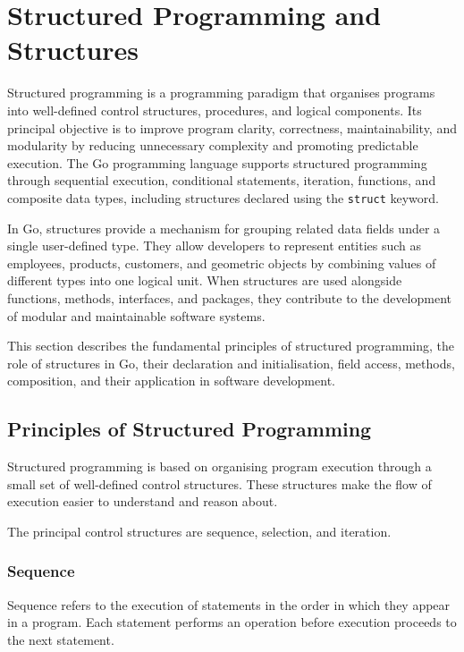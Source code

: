 \section{Structured Programming and Structures}

Structured programming is a programming paradigm that organises programs into well-defined control structures, procedures, and logical components. Its principal objective is to improve program clarity, correctness, maintainability, and modularity by reducing unnecessary complexity and promoting predictable execution. The Go programming language supports structured programming through sequential execution, conditional statements, iteration, functions, and composite data types, including structures declared using the \texttt{struct} keyword.

In Go, structures provide a mechanism for grouping related data fields under a single user-defined type. They allow developers to represent entities such as employees, products, customers, and geometric objects by combining values of different types into one logical unit. When structures are used alongside functions, methods, interfaces, and packages, they contribute to the development of modular and maintainable software systems.

This section describes the fundamental principles of structured programming, the role of structures in Go, their declaration and initialisation, field access, methods, composition, and their application in software development.

\subsection{Principles of Structured Programming}

Structured programming is based on organising program execution through a small set of well-defined control structures. These structures make the flow of execution easier to understand and reason about.

The principal control structures are sequence, selection, and iteration.

\subsubsection{Sequence}

Sequence refers to the execution of statements in the order in which they appear in a program. Each statement performs an operation before execution proceeds to the next statement.


